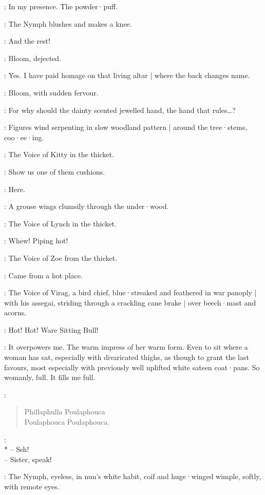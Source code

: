 \Nymph:
In my presence.
The powder·puff.

:
The Nymph blushes and makes a knee.

\Nymph:
And the rest!

:
Bloom,
dejected.

\Bloom:
Yes.
I have paid homage on that living altar |
where the back changes name.

:
Bloom,
with sudden fervour.

\Bloom:
For why should the dainty scented jewelled hand,
the hand that rules…?

:
Figures wind serpenting in slow woodland pattern |
around the tree·stems,
coo·ee·ing.

:
The Voice of Kitty in the thicket.

\VoiceKitty:
Show us one of them cushions.

\VoiceFlorry[1]:
Here.

:
A grouse wings clumsily through the under·wood.

:
The Voice of Lynch in the thicket.

\VoiceLynch:
Whew!
Piping hot!

:
The Voice of Zoe from the thicket.

\VoiceZoe:
Came from a hot place.

:
The Voice of Virag,
%
a bird chief,
blue·streaked and feathered in war panoply |
with his assegai,
striding through a crackling cane brake |
over beech·mast and acorns.

\VoiceVirag:
Hot!
Hot!
Ware Sitting Bull!

\Bloom:
It overpowers me.
The warm impress of her warm form.
Even to sit where a woman has sat,
especially with divaricated thighs,
as though to grant the last favours,
most especially with previously well uplifted white sateen coat·pans.
So womanly,
full.
It fills me full.

\Waterfall[2]:
\begin{verse}
    Phillaphulla Poulaphouca\\
%
    Poulaphouca Poulaphouca.
\end{verse}

\Yews[2]:\\*
-- Ssh!\\
-- Sister, speak!

:
The Nymph,
eyeless,
in nun's white habit,
coif and huge·winged wimple,
softly,
with remote eyes.

